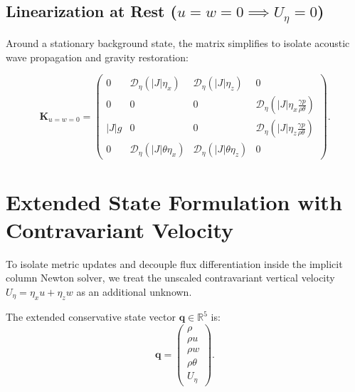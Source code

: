\documentclass[11pt,a4paper]{article}
\begin{document}
	\subsection{Linearization at Rest ($u = w = 0 \implies U_\eta = 0$)}
	
	Around a stationary background state, the matrix simplifies to isolate acoustic wave propagation and gravity restoration:
	
	\begin{equation}
		\mathbf{K}_{u=w=0} = \begin{pmatrix}
			0 & \mathcal{D}_\eta \left( |J| \eta_x \right) & \mathcal{D}_\eta \left( |J| \eta_z \right) & 0 \\[8pt]
			0 & 0 & 0 & \mathcal{D}_\eta \left( |J| \eta_x \frac{\gamma p}{\rho\theta} \right) \\[8pt]
			|J| g & 0 & 0 & \mathcal{D}_\eta \left( |J| \eta_z \frac{\gamma p}{\rho\theta} \right) \\[8pt]
			0 & \mathcal{D}_\eta \left( |J| \theta \eta_x \right) & \mathcal{D}_\eta \left( |J| \theta \eta_z \right) & 0
		\end{pmatrix}.
	\end{equation}
	
	
		
		\section{Extended State Formulation with Contravariant Velocity}
		
		To isolate metric updates and decouple flux differentiation inside the implicit column Newton solver, we treat the unscaled contravariant vertical velocity $U_\eta = \eta_x u + \eta_z w$ as an additional unknown.
		
		The extended conservative state vector $\boldsymbol{q} \in \mathbb{R}^5$ is:
		\begin{equation}
			\boldsymbol{q} = \begin{pmatrix} \rho \\[2pt] \rho u \\[2pt] \rho w \\[2pt] \rho \theta \\[2pt] U_\eta \end{pmatrix}.
		\end{equation}
		
\end{document}
